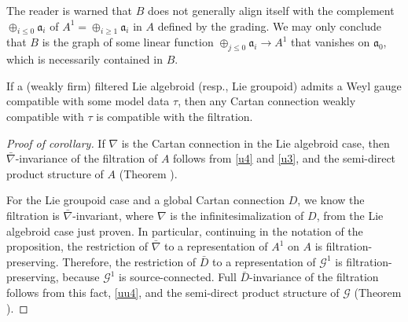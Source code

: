 \documentclass[leqno,12pt]{amsart} %
\begin{document}
The reader is warned that $B$ does not generally align itself with the complement
$\oplus_{i\le 0}{\mathfrak a}_i$ of $A^1=\oplus_{i\ge 1}{\mathfrak a}_i$ in $A$ defined by
the grading.  We may only conclude that $B$ is the graph of some linear function
$\oplus_{j\le 0} {\mathfrak a}_i \rightarrow A^1$ that vanishes on ${\mathfrak a}_0$,
which is necessarily contained in $B$.

\begin{corollary}
  If a (weakly firm) filtered Lie algebroid (resp., Lie groupoid) admits a Weyl gauge
  compatible with some model data $\tau $, then any Cartan connection weakly compatible with
  $\tau $ is compatible with the filtration.
\end{corollary}

\begin{proof}[Proof of corollary]
  If $\nabla $ is the Cartan connection in the Lie algebroid case, then
  $\bar\nabla$-invariance of the filtration of $A$ follows from \eqref{u4} and \eqref{u3},
  and the semi-direct product structure of $A$ (Theorem ).

  For the Lie groupoid case and a global Cartan connection $D$, we know the filtration is
  $\bar\nabla $-invariant, where $\nabla $ is the infinitesimalization of $D$, from the
  Lie algebroid case just proven. In particular, continuing in the notation of the
  proposition, the restriction of $\bar\nabla $ to a representation of $A^1$ on $A$ is
  filtration-preserving. Therefore, the restriction of $\bar D$ to a representation of
  ${\mathcal G}^1$ is filtration-preserving, because ${\mathcal G}^1$ is source-connected.
  Full ${\bar D}$-invariance of the filtration follows from this fact, \eqref{uu4}, and
  the semi-direct product structure of $\mathcal G$ (Theorem ).
\end{proof}
%
\end{document}
